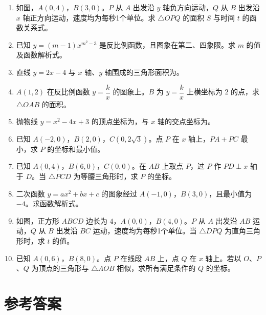 \documentclass[12pt, a4paper]{ctexart}
\newcommand{\blank}[1]{\underline{\hspace{#1}}}
\begin{document}
\begin{enumerate}[label=\textbf{\arabic*.}, leftmargin=2em]

\item 如图，$A(0,4)$，$B(3,0)$。$P$ 从 $A$ 出发沿 $y$ 轴负方向运动，$Q$ 从 $B$ 出发沿 $x$ 轴正方向运动，速度均为每秒1个单位。求 $\triangle OPQ$ 的面积 $S$ 与时间 $t$ 的函数关系式。

\item 已知 $y=(m-1)x^{m^2-3}$ 是反比例函数，且图象在第二、四象限。求 $m$ 的值及函数解析式。

\item 直线 $y=2x-4$ 与 $x$ 轴、$y$ 轴围成的三角形面积为\blank{2cm}。

\item $A(1,2)$ 在反比例函数 $y=\dfrac{k}{x}$ 的图象上。$B$ 为 $y=\dfrac{k}{x}$ 上横坐标为 $2$ 的点，求 $\triangle OAB$ 的面积。

\item 抛物线 $y=x^2-4x+3$ 的顶点坐标为\blank{2cm}，与 $x$ 轴的交点坐标为\blank{2cm}。

\item 已知 $A(-2,0)$，$B(2,0)$，$C(0,2\sqrt{3})$。点 $P$ 在 $x$ 轴上，$PA+PC$ 最小，求 $P$ 的坐标和最小值。

\item 已知 $A(0,4)$，$B(6,0)$，$C(0,0)$。在 $AB$ 上取点 $P$，过 $P$ 作 $PD\perp x$ 轴于 $D$。当 $\triangle PCD$ 为等腰三角形时，求 $P$ 的坐标。

\item 二次函数 $y=ax^2+bx+c$ 的图象经过 $A(-1,0)$，$B(3,0)$，且最小值为 $-4$。求函数解析式。

\item 如图，正方形 $ABCD$ 边长为 $4$，$A(0,0)$，$B(4,0)$。$P$ 从 $A$ 出发沿 $AB$ 运动，$Q$ 从 $B$ 出发沿 $BC$ 运动，速度均为每秒1个单位。当 $\triangle DPQ$ 为直角三角形时，求 $t$ 的值。

\item 已知 $A(0,6)$，$B(8,0)$。点 $P$ 在线段 $AB$ 上，点 $Q$ 在 $x$ 轴上。若以 $O$、$P$、$Q$ 为顶点的三角形与 $\triangle AOB$ 相似，求所有满足条件的 $Q$ 的坐标。

\end{enumerate}

\vspace{20pt}

\section*{\textcolor{mainblue}{参考答案}}
\end{document}
